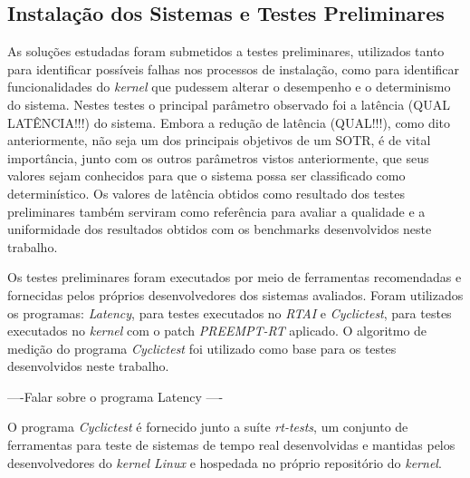 \subsection{Instalação dos Sistemas e Testes Preliminares}
As soluções estudadas foram submetidos a testes preliminares, utilizados tanto para identificar possíveis falhas nos processos de instalação, como para identificar funcionalidades do \textit{kernel} que pudessem alterar o desempenho e o determinismo do sistema. Nestes testes o principal parâmetro observado foi a latência (QUAL LATÊNCIA!!!) do sistema. Embora a redução de latência (QUAL!!!), como dito anteriormente, não seja um dos principais objetivos de um SOTR, é de vital importância, junto com os outros parâmetros vistos anteriormente, que seus valores sejam conhecidos para que o sistema possa ser classificado como determinístico. Os valores de latência obtidos como resultado dos testes preliminares também serviram como referência para avaliar a qualidade e a uniformidade dos resultados obtidos com os benchmarks desenvolvidos neste trabalho.

Os testes preliminares foram executados por meio de ferramentas recomendadas e fornecidas pelos próprios desenvolvedores dos sistemas avaliados. Foram utilizados os programas: \textit{Latency}, para testes executados no \textit{RTAI} e \textit{Cyclictest}, para testes executados no \textit{kernel} com o patch \textit{PREEMPT-RT} aplicado. O algoritmo de medição do programa \textit{Cyclictest} foi utilizado como base para os testes desenvolvidos neste trabalho.

----Falar sobre o programa Latency ----

O programa \textit{Cyclictest} é fornecido junto a suíte \textit{rt-tests}, um conjunto de ferramentas para teste de sistemas de tempo real desenvolvidas e mantidas pelos desenvolvedores do \textit{kernel Linux} e hospedada no próprio repositório do \textit{kernel}.

